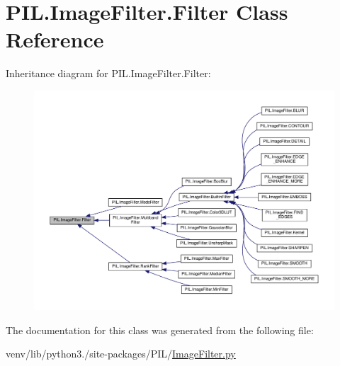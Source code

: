 \hypertarget{classPIL_1_1ImageFilter_1_1Filter}{}\section{P\+I\+L.\+Image\+Filter.\+Filter Class Reference}
\label{classPIL_1_1ImageFilter_1_1Filter}


Inheritance diagram for P\+I\+L.\+Image\+Filter.\+Filter\+:
\nopagebreak
\begin{figure}[H]
\begin{center}
\leavevmode
\includegraphics[width=350pt]{classPIL_1_1ImageFilter_1_1Filter__inherit__graph}
\end{center}
\end{figure}


The documentation for this class was generated from the following file\+:\begin{DoxyCompactItemize}
\item 
venv/lib/python3./site-\/packages/\+P\+I\+L/\hyperlink{ImageFilter_8py}{Image\+Filter.\+py}\end{DoxyCompactItemize}
